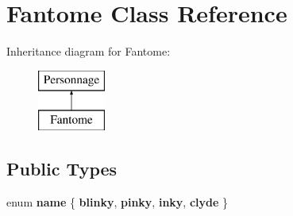 \hypertarget{class_fantome}{}\section{Fantome Class Reference}
\label{class_fantome}
Inheritance diagram for Fantome\+:\begin{figure}[H]
\begin{center}
\leavevmode
\includegraphics[height=2.000000cm]{class_fantome}
\end{center}
\end{figure}
\subsection*{Public Types}
\begin{DoxyCompactItemize}
\item 
\hypertarget{class_fantome_a4221ad1458bf13cefa0c33a477e548be}{}enum {\bfseries name} \{ {\bfseries blinky}, 
{\bfseries pinky}, 
{\bfseries inky}, 
{\bfseries clyde}
 \}\label{class_fantome_a4221ad1458bf13cefa0c33a477e548be}

\end{DoxyCompactItemize}
